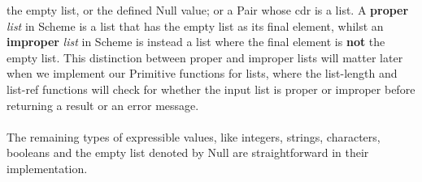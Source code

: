 the empty list, or the defined Null value; or a Pair whose cdr is a list. A \textbf{proper} \textit{list} in Scheme is a list that has the empty list as its final element, whilst an \textbf{improper} \textit{list} in Scheme is 
instead a list where the final element is \textbf{not} the empty list. This distinction between proper and improper lists will matter later when we implement our Primitive functions for lists, where the list-length and list-ref functions 
will check for whether the input list is proper or improper before returning a result or an error message.
\\
\\
The remaining types of expressible values, like integers, strings, characters, booleans and the empty list denoted by Null are straightforward in their implementation.

